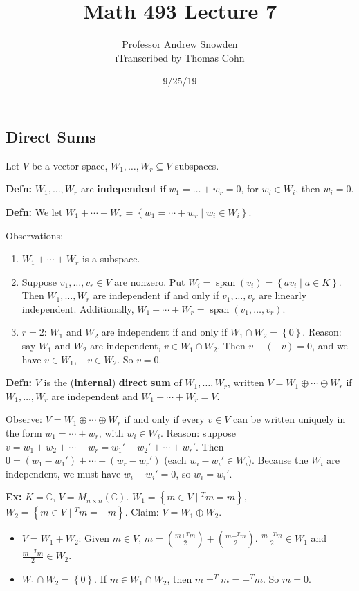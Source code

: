 \documentclass[10pt,letterpaper]{article}
\author{Professor Andrew Snowden\\ \small\i{Transcribed by Thomas Cohn}}
\title{Math 493 Lecture 7}
\date{9/25/19} %
\newcommand{\n}{\hfill\break}
\newcommand{\hangblock}[2]{\par\noindent\settowidth{\hangindent}{\textbf{#1: }}\textbf{#1: }\!\!\!#2}
\newcommand{\defn}[1]{\hangblock{Defn}{#1}}
\newcommand{\ex}[1]{\hangblock{Ex}{#1}}
\newcommand{\set}[1]{\left\{#1\right\}}
\newcommand{\complex}{\mathbb{C}}
\newcommand{\C}{\complex}
\newcommand{\tpose}{^{T}\!}
\DeclareMathOperator{\vspan}{span}
\newcommand{\paren}[1]{\left(#1\right)}
\begin{document}
\maketitle
\setlength\RaggedRightParindent{\parindent}
\RaggedRight

\subsection*{Direct Sums}

\par\noindent
Let $V$ be a vector space, $W_{1},\ldots,W_{r}\subseteq{}V$ subspaces.\n

\defn{
	$W_{1},\ldots,W_{r}$ are \textbf{independent} if $w_{1}=\ldots+w_{r}=0$, for $w_{i}\in{}W_{i}$, then $w_{i}=0$.\n
}

\defn{
	We let $W_{1}+\cdots+W_{r}=\set{w_{1}=\cdots+w_{r}\mid{}w_{i}\in{}W_{i}}$.\n
}

\par\noindent
Observations:
\begin{enumerate}
	\item $W_{1}+\cdots+W_{r}$ is a subspace.
	\item Suppose $v_{1},\ldots,v_{r}\in{}V$ are nonzero. Put $W_{i}=\vspan(v_{i})=\set{av_{i}\mid{}a\in{}K}$. Then $W_{1},\ldots,W_{r}$ are independent if and only if $v_{1},\ldots,v_{r}$ are linearly independent. Additionally, $W_{1}+\cdots+W_{r}=\vspan(v_{1},\ldots,v_{r})$.
	\item $r=2$: $W_{1}$ and $W_{2}$ are independent if and only if $W_{1}\cap{}W_{2}=\set{0}$.\n
	Reason: say $W_{1}$ and $W_{2}$ are independent, $v\in{}W_{1}\cap{}W_{2}$. Then $v+(-v)=0$, and we have $v\in{}W_{1}$, $-v\in{}W_{2}$. So $v=0$.
\end{enumerate}

\defn{
	$V$ is the (\textbf{internal}) \textbf{direct sum} of $W_{1},\ldots,W_{r}$, written $V=W_{1}\oplus\cdots\oplus{}W_{r}$ if $W_{1},\ldots,W_{r}$ are independent and $W_{1}+\cdots+W_{r}=V$.\n
}

\par\noindent
Observe: $V=W_{1}\oplus\cdots\oplus{}W_{r}$ if and only if every $v\in{}V$ can be written uniquely in the form $w_{1}=\cdots+w_{r}$, with $w_{i}\in{}W_{i}$.\n
Reason: suppose $v=w_{1}+w_{2}+\cdots+w_{r}=w_{1}'+w_{2}'+\cdots+w_{r}'$. Then $0=(w_{1}-w_{1}')+\cdots+(w_{r}-w_{r}')$ (each $w_{i}-w_{i}'\in{}W_{i}$). Because the $W_{i}$ are independent, we must have $w_{i}-w_{i}'=0$, so $w_{i}=w_{i}'$.\n

\ex{
	$K=\C$, $V=M_{n\times{}n}(\C)$. $W_{1}=\set{m\in{}V\mid{}\tpose{}m=m}$, $W_{2}=\set{m\in{}V\mid{}\tpose{}m=-m}$.\n
	Claim: $V=W_{1}\oplus{}W_{2}$.
	\begin{itemize}
		\item $V=W_{1}+W_{2}$: Given $m\in{}V$, $m=\paren{\frac{m+\tpose{}m}{2}}+\paren{\frac{m-\tpose{}m}{2}}$. $\frac{m+\tpose{}m}{2}\in{}W_{1}$ and $\frac{m-\tpose{}m}{2}\in{}W_{2}$.
		\item $W_{1}\cap{}W_{2}=\set{0}$. If $m\in{}W_{1}\cap{}W_{2}$, then $m=\tpose{}m=-\tpose{}m$. So $m=0$.
	\end{itemize}
}
\end{document}

